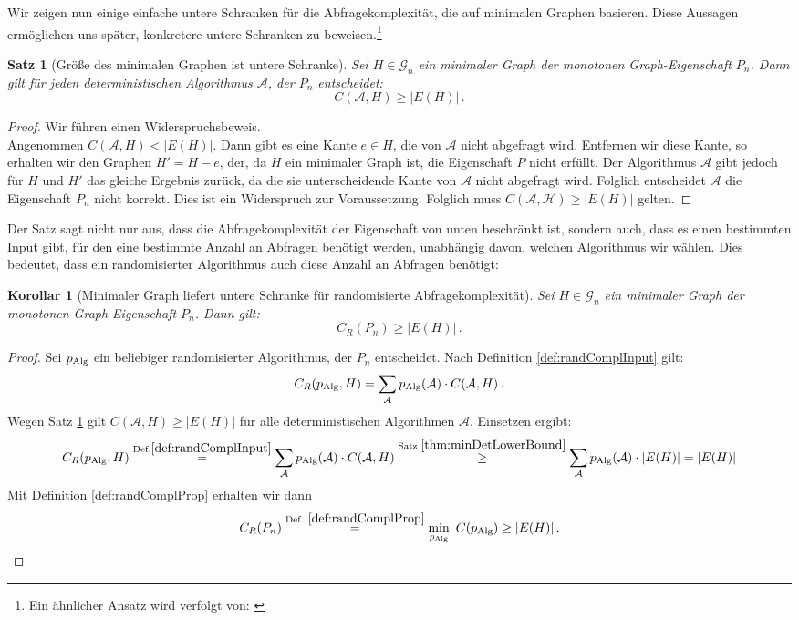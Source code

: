 \documentclass[10pt,a4paper]{scrreprt}
\newtheorem{Satz}[definition]{Satz}
\newtheorem{corollary}[definition]{Korollar}
\theoremstyle{definition}
\begin{document}
Wir zeigen nun einige einfache untere Schranken
für die Abfragekomplexität, die auf minimalen
Graphen basieren. Diese Aussagen ermöglichen uns
später, konkretere untere Schranken zu beweisen.\footnote{
Ein ähnlicher Ansatz wird verfolgt von: \cite{Groeger}}
\begin{Satz}[Größe des minimalen Graphen ist untere Schranke]
\label{thm:minDetLowerBound}
Sei $H\in \mathcal{G}_n$ ein minimaler Graph der monotonen
Graph-Eigenschaft $P_n$. Dann gilt für jeden deterministischen
Algorithmus $\mathcal{A}$, der $P_n$ entscheidet:
$$ C(\mathcal{A},H) \geq |E(H)|\,.$$
\end{Satz}
\begin{proof}
Wir führen einen Widerspruchsbeweis. \\
Angenommen $ C(\mathcal{A},H) < |E(H)| $.
Dann gibt es eine Kante $e\in H$,
die von $\mathcal{A}$ nicht abgefragt wird. Entfernen wir
diese Kante, so erhalten wir den Graphen $H' = H - e$, der,
da $H$ ein minimaler Graph ist, die Eigenschaft $P$ nicht
erfüllt. Der Algorithmus $\mathcal{A}$ gibt jedoch für $H$ und $H'$ das gleiche
Ergebnis zurück, da die sie unterscheidende Kante von $\mathcal{A}$
nicht abgefragt wird. Folglich entscheidet $\mathcal{A}$ die
Eigenschaft $P_n$ nicht korrekt. Dies ist ein Widerspruch zur
Voraussetzung. Folglich muss $ C(\mathcal{A,H}) \geq |E(H)| $ gelten. 
\end{proof}
Der Satz sagt nicht nur aus, dass die Abfragekomplexität
der Eigenschaft von unten beschränkt ist, sondern auch, dass
es einen bestimmten Input gibt, für den eine bestimmte Anzahl
an Abfragen benötigt werden, unabhängig davon, welchen Algorithmus
wir wählen. Dies bedeutet, dass ein randomisierter Algorithmus
auch diese Anzahl an Abfragen benötigt:
\begin{corollary}[Minimaler Graph liefert untere Schranke für 
                  randomisierte Abfragekomplexität]
\label{cor:MinGraphRandCompl}
Sei $H\in \mathcal{G}_n$ ein minimaler Graph der monotonen
Graph-Eigenschaft $P_n$. Dann gilt:
$$C_R(P_n) \geq |E(H)|\,.$$
\end{corollary}
\begin{proof}
Sei $p_\textup{Alg}$ ein beliebiger randomisierter Algorithmus,
der $P_n$ entscheidet.
Nach Definition \ref{def:randComplInput} gilt: 
$$ C_R(p_\textup{Alg}, H) = 
\sum_\mathcal{A} p_\textup{Alg}(\mathcal{A}) \cdot C(\mathcal{A}, H)\,.$$
Wegen Satz \ref{thm:minDetLowerBound} gilt $C(\mathcal{A}, H) \geq |E(H)|$
für alle deterministischen Algorithmen $\mathcal{A}$. Einsetzen ergibt:
$$ C_R(p_\textup{Alg}, H) \overset{\textup{Def.} \ref{def:randComplInput}} {=}
\sum_\mathcal{A} p_\textup{Alg}(\mathcal{A}) \cdot C(\mathcal{A}, H) 
\overset{\textup{Satz } \ref{thm:minDetLowerBound}} {\geq}
\sum_\mathcal{A} p_\textup{Alg}(\mathcal{A}) \cdot |E(H)| =
|E(H)| $$
Mit Definition \ref{def:randComplProp} erhalten wir dann
\begin{equation*}
C_R(P_n) \overset{\textup{Def. } \ref{def:randComplProp}} {=} 
\min_{p_\textup{Alg}}\ C(p_\textup{Alg}) \geq |E(H)|\,. \qedhere
\end{equation*}
\end{proof}
\end{document}
